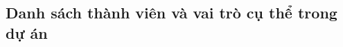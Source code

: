 \subsection{Danh sách thành viên và vai trò cụ thể trong dự án}
\begingroup
\small
\setlength{\tabcolsep}{5pt}
\renewcommand{\arraystretch}{1.18}
\newcommand{\membercell}[2]{\begin{minipage}[t]{\linewidth}\raggedright\textbf{#1}\\{\footnotesize\color{textMuted}#2}\end{minipage}}
\newcommand{\rolecell}[5]{\begin{minipage}[t]{\linewidth}\raggedright\textbf{#1:}
\begin{itemize}[leftmargin=*,topsep=2pt,itemsep=1pt,parsep=0pt]
    \item #2
    \item #3
    \item #4
    \item #5
\end{itemize}
\end{minipage}}

